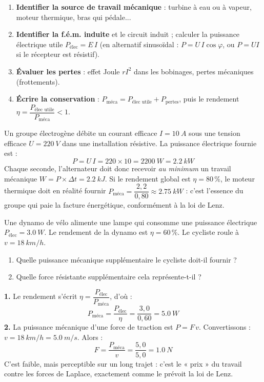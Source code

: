 \documentclass[11pt]{article}
\begin{document}
\begin{methode}
\begin{enumerate}
\item \textbf{Identifier la source de travail mécanique} : turbine à eau ou à vapeur, moteur thermique, bras qui pédale...
\item \textbf{Identifier la f.é.m. induite} et le circuit induit ; calculer la puissance électrique utile $P_{\text{élec}} = E\,I$ (en alternatif sinusoïdal : $P = U\,I\cos\varphi$, ou $P = UI$ si le récepteur est résistif).
\item \textbf{Évaluer les pertes} : effet Joule $rI^2$ dans les bobinages, pertes mécaniques (frottements).
\item \textbf{Écrire la conservation} : $P_{\text{méca}} = P_{\text{élec utile}} + P_{\text{pertes}}$, puis le rendement $\eta = \dfrac{P_{\text{élec utile}}}{P_{\text{méca}}} < 1$.
\end{enumerate}
\end{methode}

\begin{exemplebox}
Un groupe électrogène débite un courant efficace $I = \SI{10}{A}$ sous une tension efficace $U = \SI{220}{V}$ dans une installation résistive. La puissance électrique fournie est :
\[ P = U\,I = 220 \times 10 = \SI{2200}{W} = \SI{2,2}{kW} \]
Chaque seconde, l'alternateur doit donc recevoir \emph{au minimum} un travail mécanique $W = P \times \Delta t = \SI{2,2}{kJ}$. Si le rendement global est $\eta = 80\,\%$, le moteur thermique doit en réalité fournir $P_{\text{méca}} = \dfrac{2{,}2}{0{,}80} \approx \SI{2,75}{kW}$ : c'est l'essence du groupe qui paie la facture énergétique, conformément à la loi de Lenz.
\end{exemplebox}

\begin{exoresolu}
Une dynamo de vélo alimente une lampe qui consomme une puissance électrique $P_{\text{élec}} = \SI{3,0}{W}$. Le rendement de la dynamo est $\eta = 60\,\%$. Le cycliste roule à $v = \SI{18}{km/h}$.
\begin{enumerate}
\item Quelle puissance mécanique supplémentaire le cycliste doit-il fournir ?
\item Quelle force résistante supplémentaire cela représente-t-il ?
\end{enumerate}
\tcblower
\textbf{1.} Le rendement s'écrit $\eta = \dfrac{P_{\text{élec}}}{P_{\text{méca}}}$, d'où :
\[ P_{\text{méca}} = \dfrac{P_{\text{élec}}}{\eta} = \dfrac{3{,}0}{0{,}60} = \SI{5,0}{W} \]
\textbf{2.} La puissance mécanique d'une force de traction est $P = F\,v$. Convertissons : $v = \SI{18}{km/h} = \SI{5,0}{m/s}$. Alors :
\[ F = \dfrac{P_{\text{méca}}}{v} = \dfrac{5{,}0}{5{,}0} = \SI{1,0}{N} \]
C'est faible, mais perceptible sur un long trajet : c'est le « prix » du travail contre les forces de Laplace, exactement comme le prévoit la loi de Lenz.
\end{exoresolu}
\end{document}
